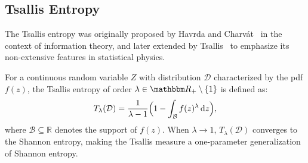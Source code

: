 \documentclass[
  lettersize  journal,
]{IEEEtran}%
\begin{document}
\subsection{Tsallis Entropy}\label{tsallis-entropy}

The Tsallis entropy was originally proposed by Havrda and
Charvát~ in the context of
information theory, and later extended by
Tsallis~ to emphasize its
non-extensive features in statistical physics.

For a continuous random variable \(Z\) with distribution \(\mathcal D\)
characterized by the pdf \(f(z)\), the Tsallis entropy of order
\(\lambda \in \mathbbm R_+ \setminus \{1\}\) is defined as:
\begin{equation}
\label{eq:tsallis}
T_\lambda(\mathcal D) = \frac{1}{\lambda - 1} \Bigl( 1 - \int_{\mathcal{B}} f(z)^{\lambda} \,\mathrm{d}z \Bigr),
\end{equation} where \(\mathcal{B} \subseteq \mathbb{R}\) denotes the
support of \(f(z)\). When \(\lambda \to 1\), \(T_\lambda(\mathcal D)\)
converges to the Shannon entropy, making the Tsallis measure a
one-parameter generalization of Shannon entropy.
\end{document}
